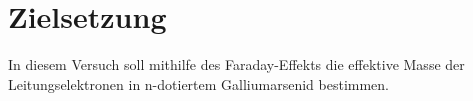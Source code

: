 \section{Zielsetzung}
In diesem Versuch soll mithilfe des Faraday-Effekts die effektive Masse der Leitungselektronen
in n-dotiertem Galliumarsenid bestimmen.

\label{sec:Zielsetzung}
